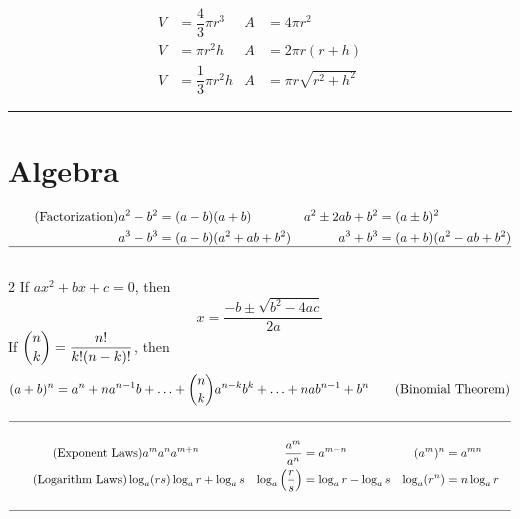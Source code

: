 \documentclass{book}
\begin{document}
\begin{appendices}
\begin{align}
\tag{Sphere} V &= \dfrac{4}{3}\pi r^3& A &= 4\pi r^2\\
\tag{Cylinder} V &=\pi r^2h& A  &= 2\pi r(r+h)\\
\tag{Cone} V &= \dfrac{1}{3}\pi r^2h& A&= \pi r\sqrt{r^2+h^2}
\end{align}\vs\hrule\vs

\section*{Algebra}
\begin{align} \tag{Factorization} 
 a^2-b^2 & =(a-b)(a+b) & a^2\pm2ab+b^2 &= (a\pm b)^2\\
\nonumber a^3-b^3 & =(a-b)(a^2+ab+b^2) & a^3+b^3 & =(a+b)(a^2-ab+b^2)\\\hline\nonumber
\end{align}
\begin{paracol}{2}
If $ax^2+bx+c=0$, then 
\begin{equation} \tag{Quadratic Equation} x=\dfrac{-b\pm\sqrt{b^2-4ac}}{2a}\end{equation}
\switchcolumn
If $\dbinom{n}{k} = \dfrac{n!}{k!(n-k)!}$, then 
\begin{equation} (a+b)^n = a^n + na^{n-1}b + \ldots + \dbinom{n}{k}a^{n-k}b^k+\ldots +nab^{n-1} + b^n\tag{Binomial Theorem}\end{equation}
\end{paracol}
\begin{align}\hline\nonumber\\
\tag{Exponent Laws}  a^ma^n & a^{m+n} & \dfrac{a^m}{a^n} & = a^{m-n} & (a^m)^n &= a^{mn} \\
\tag{Logarithm Laws} \log_a(rs) & \log_a r + \log_a s & \log_a\left(\dfrac{r}{s}\right) & = \log_a r - \log_a s & \log_a(r^n) &= n\log_a r \\\nonumber\\\hline\nonumber
\end{align}


\end{appendices}
\end{document}
